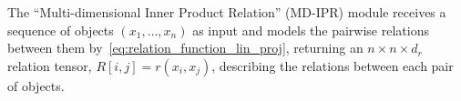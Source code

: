The ``Multi-dimensional Inner Product Relation'' (MD-IPR) module receives a sequence of objects $(x_1, \ldots, x_n)$ as input and models the pairwise relations between them by~\cref{eq:relation_function_lin_proj}, returning an $n \times n \times d_r$ relation tensor, $R[i,j] = r(x_i, x_j)$, describing the relations between each pair of objects.
